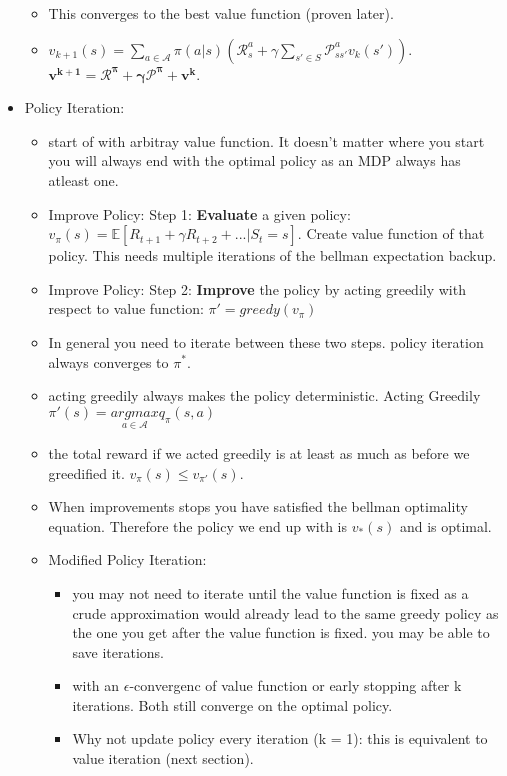 \begin{itemize}[noitemsep,nolistsep]
\begin{itemize}[noitemsep,nolistsep]
		\item This converges to the best value function (proven later).
		\item $v_{k+1}(s) = \sum_{a \in \mathcal{A}}\pi(a|s)(\mathcal{R}_s^a + \gamma \sum_{s' \in S}\mathcal{P}_{ss'}^a v_k(s'))$. $\mathbf{v^{k+1} = \mathcal{R}^\pi + \gamma \mathcal{P}^\pi + v^k}$.
	\end{itemize}
	\item Policy Iteration:
	\begin{itemize}[noitemsep,nolistsep]
		\item start of with arbitray value function. It doesn't matter where you start you will always end with the optimal policy as an MDP always has atleast one.
		\item Improve Policy: Step 1: \textbf{Evaluate} a given policy: $v_\pi(s) = \mathbb{E}[R_{t+1} + \gamma R_{t+2}+ ... | S_t = s]$. Create value function of that policy. This needs multiple iterations of the bellman expectation backup.
		\item Improve Policy: Step 2: \textbf{Improve} the policy by acting greedily with respect to value function: $\pi' = greedy(v_\pi)$
		\item In general you need to iterate between these two steps. policy iteration always converges to $\pi^*$.
		\item acting greedily always makes the policy deterministic. Acting Greedily $\pi'(s) = \underset{a \in \mathcal{A}}{argmax} q_\pi (s,a)$
		\item the total reward if we acted greedily is at least as much as before we greedified it. $v_\pi(s) \leq v_{\pi'}(s)$.
		\item When improvements stops you have satisfied the bellman optimality equation. Therefore the policy we end up with is $v_*(s)$ and is optimal.
		\item Modified Policy Iteration:
		\begin{itemize}[noitemsep,nolistsep]
			\item you may not need to iterate until the value function is fixed as a crude approximation would already lead to the same greedy policy as the one you get after the value function is fixed. you may be able to save iterations.
			\item with an $\epsilon$-convergenc of value function or early stopping after k iterations. Both still converge on the optimal policy.
			\item Why not update policy every iteration (k = 1): this is equivalent to value iteration (next section).

\end{itemize}
\end{itemize}
\end{itemize}
